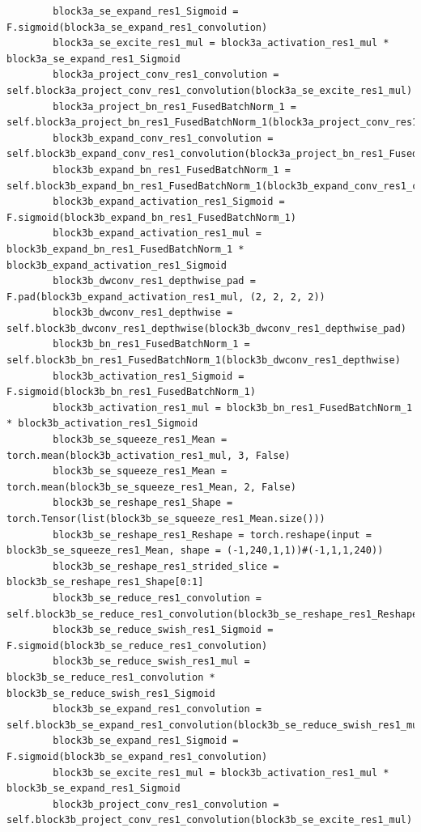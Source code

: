 \documentclass{fisatprojectfinal}
\begin{document}
\begin{appendices}
\begin{lstlisting}
        block3a_se_expand_res1_Sigmoid = F.sigmoid(block3a_se_expand_res1_convolution)
        block3a_se_excite_res1_mul = block3a_activation_res1_mul * block3a_se_expand_res1_Sigmoid
        block3a_project_conv_res1_convolution = self.block3a_project_conv_res1_convolution(block3a_se_excite_res1_mul)
        block3a_project_bn_res1_FusedBatchNorm_1 = self.block3a_project_bn_res1_FusedBatchNorm_1(block3a_project_conv_res1_convolution)
        block3b_expand_conv_res1_convolution = self.block3b_expand_conv_res1_convolution(block3a_project_bn_res1_FusedBatchNorm_1)
        block3b_expand_bn_res1_FusedBatchNorm_1 = self.block3b_expand_bn_res1_FusedBatchNorm_1(block3b_expand_conv_res1_convolution)
        block3b_expand_activation_res1_Sigmoid = F.sigmoid(block3b_expand_bn_res1_FusedBatchNorm_1)
        block3b_expand_activation_res1_mul = block3b_expand_bn_res1_FusedBatchNorm_1 * block3b_expand_activation_res1_Sigmoid
        block3b_dwconv_res1_depthwise_pad = F.pad(block3b_expand_activation_res1_mul, (2, 2, 2, 2))
        block3b_dwconv_res1_depthwise = self.block3b_dwconv_res1_depthwise(block3b_dwconv_res1_depthwise_pad)
        block3b_bn_res1_FusedBatchNorm_1 = self.block3b_bn_res1_FusedBatchNorm_1(block3b_dwconv_res1_depthwise)
        block3b_activation_res1_Sigmoid = F.sigmoid(block3b_bn_res1_FusedBatchNorm_1)
        block3b_activation_res1_mul = block3b_bn_res1_FusedBatchNorm_1 * block3b_activation_res1_Sigmoid
        block3b_se_squeeze_res1_Mean = torch.mean(block3b_activation_res1_mul, 3, False)
        block3b_se_squeeze_res1_Mean = torch.mean(block3b_se_squeeze_res1_Mean, 2, False)
        block3b_se_reshape_res1_Shape = torch.Tensor(list(block3b_se_squeeze_res1_Mean.size()))
        block3b_se_reshape_res1_Reshape = torch.reshape(input = block3b_se_squeeze_res1_Mean, shape = (-1,240,1,1))#(-1,1,1,240))
        block3b_se_reshape_res1_strided_slice = block3b_se_reshape_res1_Shape[0:1]
        block3b_se_reduce_res1_convolution = self.block3b_se_reduce_res1_convolution(block3b_se_reshape_res1_Reshape)
        block3b_se_reduce_swish_res1_Sigmoid = F.sigmoid(block3b_se_reduce_res1_convolution)
        block3b_se_reduce_swish_res1_mul = block3b_se_reduce_res1_convolution * block3b_se_reduce_swish_res1_Sigmoid
        block3b_se_expand_res1_convolution = self.block3b_se_expand_res1_convolution(block3b_se_reduce_swish_res1_mul)
        block3b_se_expand_res1_Sigmoid = F.sigmoid(block3b_se_expand_res1_convolution)
        block3b_se_excite_res1_mul = block3b_activation_res1_mul * block3b_se_expand_res1_Sigmoid
        block3b_project_conv_res1_convolution = self.block3b_project_conv_res1_convolution(block3b_se_excite_res1_mul)

\end{lstlisting}
\end{appendices}
\end{document}
